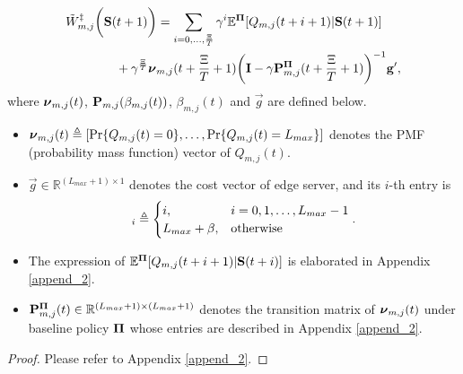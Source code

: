 \begin{lemma}
    \label{lemma:w_es}
    {\small
    \begin{align}
        &\tilde{W}^{\ddagger}_{m,j}\bigg(\mathbf{S}(t+1)\bigg)
    = \sum_{i=0,\dots,\frac{\Xi}{T}} \gamma^{i} \mathbb{E}^{\boldsymbol{\Pi}}[ Q_{m,j}({t+i+1}) | \mathbf{S}(t+1)]
    \nonumber\\
    &~~~~~~~~~~~~+ \gamma^{\frac{\Xi}{T}} 
    \boldsymbol{\nu}_{m,j}({t+\frac{\Xi}{T}+1})
    \bigg(
        \mathbf{I} - \gamma \mathbf{P}^{\boldsymbol{\Pi}}_{m,j}(t+\frac{\Xi}{T}+1)
    \bigg)^{-1} \mathbf{g}',
        \label{w_es}
    \end{align}   
    }
    where $\boldsymbol{\nu}_{m,j}(t)$, $\mathbf{P}_{m,j}(\beta_{m,j}(t))$, $\beta_{m,j}(t)$ and $\vec{g}$ are defined below.
    \begin{itemize}
        \item {\small
        $\boldsymbol{\nu}_{m,j}(t) \triangleq [\Pr\{Q_{m,j}(t)=0\}, \dots, \Pr\{Q_{m,j}(t)=L_{max}\}]$
        } denotes the PMF (probability mass function) vector of $Q_{m,j}(t)$.
        \item $\vec{g} \in \mathbb{R}^{(L_{max}+1) \times 1}$ denotes the cost vector of edge server, and its $i$-th entry is
        \begin{align}
            [\vec{g}]_{i} \define 
            \begin{cases}
                i, & i=0,1,\dots,L_{max}-1
                \\
                L_{max}+\beta, & \text{otherwise}
            \end{cases}.
            \label{eqn:g_vec}
        \end{align}
        \item The expression of $\mathbb{E}^{\boldsymbol{\Pi}}[ Q_{m,j}({t+i+1}) | \mathbf{S}(t+i)]$ is elaborated in Appendix \ref{append_2}.
        \item $\mathbf{P}^{\boldsymbol{\Pi}}_{m,j}(t) \in \mathbb{R}^{(L_{max}+1) \times (L_{max}+1)}$ denotes the transition matrix of $\boldsymbol{\nu}_{m,j}(t)$ under baseline policy $\boldsymbol{\Pi}$ whose entries are described in Appendix \ref{append_2}.
    \end{itemize}   
\end{lemma}
\begin{proof}
    Please refer to Appendix \ref{append_2}.
\end{proof}

